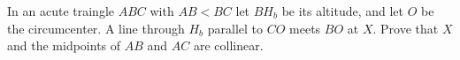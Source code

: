 In an acute traingle $ABC$ with  $AB< BC$ let $BH_b$ be its altitude, and let $O$ be the circumcenter. A line through $H_b$ parallel to $CO$ meets $BO$ at $X$. Prove that $X$ and the midpoints of $AB$ and $AC$ are collinear.